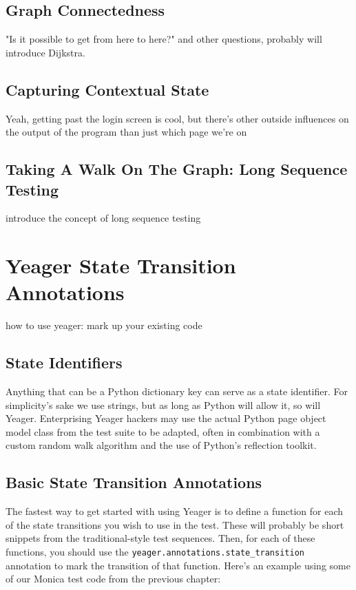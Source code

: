 \subsection{Graph Connectedness}
"Is it possible to get from here to here?" and other questions, probably will introduce Dijkstra. %

\subsection{Capturing Contextual State}
Yeah, getting past the login screen is cool, but there's other outside influences on the output of the program than just which page we're on %

\subsection{Taking A Walk On The Graph: Long Sequence Testing}
introduce the concept of long sequence testing %

\section{Yeager State Transition Annotations}
how to use yeager: mark up your existing code %

\subsection{State Identifiers}
Anything that can be a Python dictionary key can serve as a state identifier. For simplicity's sake we use strings, but as long as Python will allow it, so will Yeager. Enterprising Yeager hackers may use the actual Python page object model class from the test suite to be adapted, often in combination with a custom random walk algorithm and the use of Python's reflection toolkit.%

\subsection{Basic State Transition Annotations}
The fastest way to get started with using Yeager is to define a function for each of the state transitions you wish to use in the test. These will probably be short snippets from the traditional-style test sequences. Then, for each of these functions, you should use the \texttt{yeager.annotations.state\_transition} annotation to mark the transition of that function. Here's an example using some of our Monica test code from the previous chapter:

